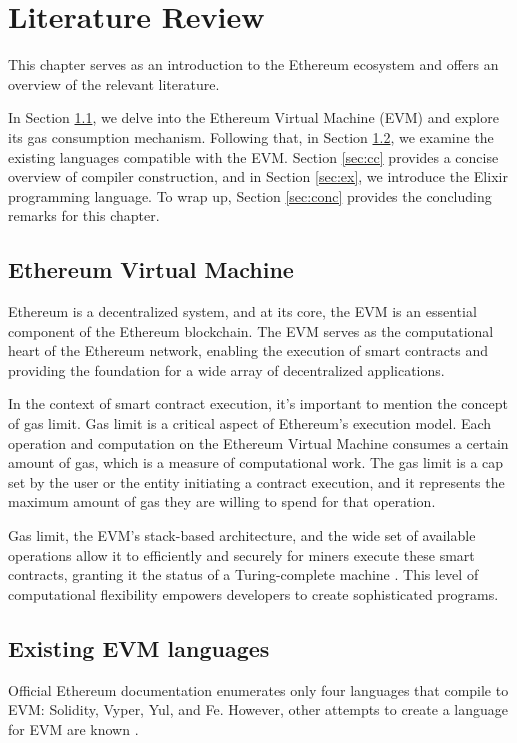 \chapter{Literature Review}
\label{chap:lr}

This chapter serves as an introduction to the Ethereum ecosystem and offers an overview of the relevant literature.

In Section \ref{sec:evm}, we delve into the Ethereum Virtual Machine (EVM) and explore its gas consumption mechanism. Following that, in Section \ref{sec:langs}, we examine the existing languages compatible with the EVM. Section \ref{sec:cc} provides a concise overview of compiler construction, and in Section \ref{sec:ex}, we introduce the Elixir programming language. To wrap up, Section \ref{sec:conc} provides the concluding remarks for this chapter.

\section{Ethereum Virtual Machine}
\label{sec:evm}
Ethereum is a decentralized system, and at its core, the EVM is an essential component of the Ethereum blockchain. The EVM serves as the computational heart of the Ethereum network, enabling the execution of smart contracts and providing the foundation for a wide array of decentralized applications.

In the context of smart contract execution, it's important to mention the concept of gas limit. Gas limit is a critical aspect of Ethereum's execution model. Each operation and computation on the Ethereum Virtual Machine consumes a certain amount of gas, which is a measure of computational work. The gas limit is a cap set by the user or the entity initiating a contract execution, and it represents the maximum amount of gas they are willing to spend for that operation.

Gas limit, the EVM's stack-based architecture, and the wide set of available operations allow it to efficiently and securely for miners execute these smart contracts, granting it the status of a Turing-complete machine \cite{EthereumWhitepaper}. This level of computational flexibility empowers developers to create sophisticated programs.

\section{Existing EVM languages}
\label{sec:langs}
Official Ethereum documentation \cite{OfficialEthereumLanguages} enumerates only four languages that compile to EVM: Solidity, Vyper, Yul, and Fe. However, other attempts to create a language for EVM are known \cite{CommunityEthereumLanguages}.

